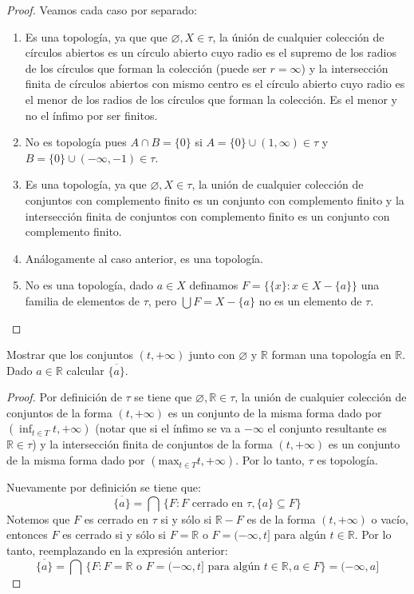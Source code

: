 \documentclass{article}
\theoremstyle{definition}
\newcommand{\R}{\mathbb{R}}
\newenvironment{ejercicio}[1]{\begin{trivlist}
\item[\hskip \labelsep {\bfseries Ejercicio}\hskip \labelsep {\bfseries #1.}]}{\end{trivlist}}
\begin{document}
\begin{proof}
    Veamos cada caso por separado:
    \begin{enumerate}
        \item Es una topología, ya que que \( \varnothing, X \in \tau \), la únión de cualquier colección de círculos abiertos es un círculo abierto cuyo radio es el supremo de los radios de los círculos que forman la colección (puede ser \( r = \infty \)) y la intersección finita de círculos abiertos con mismo centro es el círculo abierto cuyo radio es el menor de los radios de los círculos que forman la colección. Es el menor y no el ínfimo por ser finitos.
        \item No es topología pues \( A \cap B = \{ 0 \} \) si \( A = \{ 0 \} \cup (1, \infty) \in \tau \) y \( B = \{ 0 \} \cup (-\infty, -1) \in \tau \).
        \item Es una topología, ya que \( \varnothing, X \in \tau \), la unión de cualquier colección de conjuntos con complemento finito es un conjunto con complemento finito y la intersección finita de conjuntos con complemento finito es un conjunto con complemento finito.
        \item Análogamente al caso anterior, es una topología.
        \item No es una topología, dado \( a \in X \) definamos \( F = \{ \{ x \} : x \in X - \{ a \} \} \) una familia de elementos de \( \tau \), pero \( \bigcup F = X - \{ a \} \) no es un elemento de \( \tau \).
    \end{enumerate}
\end{proof}

\clearpage

\begin{ejercicio}{3}
    Mostrar que los conjuntos \((t,+\infty)\) junto con \(\varnothing \) y \(\R \) forman una topología en \(\R \). Dado \(a\in\R \) calcular \(\overline{\{a\}}\).
\end{ejercicio}
\begin{proof}
    Por definición de \( \tau \) se tiene que \( \varnothing, \R \in \tau \), la unión de cualquier colección de conjuntos de la forma \( (t, +\infty) \) es un conjunto de la misma forma dado por \( (\inf_{t \in T} t, +\infty) \) (notar que si el ínfimo se va a \(- \infty \) el conjunto resultante es \( \R \in \tau \)) y la intersección finita de conjuntos de la forma \( (t, +\infty) \) es un conjunto de la misma forma dado por \( (\text{max}_{t \in T} t, +\infty) \). Por lo tanto, \( \tau \) es topología.

    Nuevamente por definición se tiene que:
    \[
        \overline{\{ a \}} = \bigcap \, \{ F : F \text{ cerrado en } \tau, \{ a \} \subseteq F \}
    \]
    Notemos que \( F \) es cerrado en \( \tau \) si y sólo si \( \R - F \) es de la forma \( (t, +\infty) \) o vacío, entonces \( F \) es cerrado si y sólo si \( F = \R \) o \( F = (-\infty, t] \) para algún \( t \in \R \). Por lo tanto, reemplazando en la expresión anterior:
    \[
        \overline{\{ a \}} = \bigcap \, \{ F : F = \R \text{ o } F = (-\infty, t] \text{ para algún } t \in \R, a \in F \} = (-\infty, a]
    \]
\end{proof}
\end{document}

